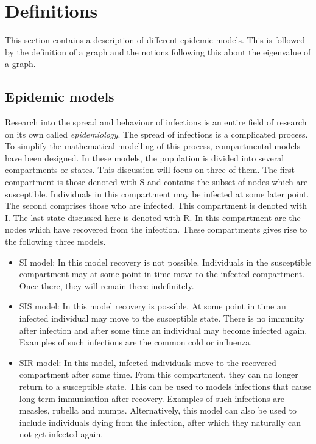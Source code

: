 \documentclass[11pt]{article}
\theoremstyle{definition}
\begin{document}
\cleardoublepage

\section{Definitions}

This section contains a description of different epidemic models. This is followed by the definition of a graph and the notions following this about the eigenvalue of a graph.

\subsection{Epidemic models}

Research into the spread and behaviour of infections is an entire field of research on its own called \emph{epidemiology}. The spread of infections is a complicated process. To simplify the mathematical modelling of this process, compartmental models have been designed. In these models, the population is divided into several compartments or states. This discussion will focus on three of them. The first compartment is those denoted with S and contains the subset of nodes which are susceptible. Individuals in this compartment may be infected at some later point. The second comprises those who are infected. This compartment is denoted with I. The last state discussed here is denoted with R. In this compartment are the nodes which have recovered from the infection. These compartments gives rise to the following three models.


\begin{itemize}
\item SI model: In this model recovery is not possible. Individuals in the susceptible compartment may at some point in time move to the infected compartment. Once there, they will remain there indefinitely.
\item SIS model: In this model recovery is possible. At some point in time an infected individual may move to the susceptible state. There is no immunity after infection and after some time an individual may become infected again. Examples of such infections are the common cold or influenza.
\item SIR model: In this model, infected individuals move to the recovered compartment after some time. From this compartment, they can no longer return to a susceptible state. This can be used to models infections that cause long term immunisation after recovery. Examples of such infections are measles, rubella and mumps. Alternatively, this model can also be used to include individuals dying from the infection, after which they naturally can not get infected again.
\end{itemize}
\end{document}
